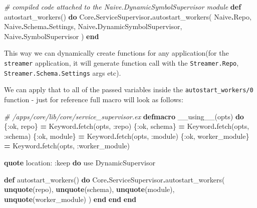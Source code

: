 \documentclass[
]{book}
\newenvironment{Shaded}{\begin{snugshade}}{\end{snugshade}}
\newcommand{\CommentTok}[1]{\textcolor[rgb]{0.56,0.35,0.01}{\textit{#1}}}
\newcommand{\ConstantTok}[1]{\textcolor[rgb]{0.00,0.00,0.00}{#1}}
\newcommand{\ImportTok}[1]{#1}
\newcommand{\KeywordTok}[1]{\textcolor[rgb]{0.13,0.29,0.53}{\textbf{#1}}}
\newcommand{\NormalTok}[1]{#1}
\newcommand{\OperatorTok}[1]{\textcolor[rgb]{0.81,0.36,0.00}{\textbf{#1}}}
\newcommand{\VariableTok}[1]{\textcolor[rgb]{0.00,0.00,0.00}{#1}}
\begin{document}
\begin{Shaded}
\begin{Highlighting}[]
    \CommentTok{\# compiled code attached to the \textasciigrave{}Naive.DynamicSymbolSupervisor\textasciigrave{} module}
    \KeywordTok{def}\NormalTok{ autostart\_workers() }\KeywordTok{do}
      \ConstantTok{Core}\OperatorTok{.}\ConstantTok{ServiceSupervisor}\OperatorTok{.}\NormalTok{autostart\_workers(}
        \ConstantTok{Naive}\OperatorTok{.}\ConstantTok{Repo}\NormalTok{,}
        \ConstantTok{Naive}\OperatorTok{.}\ConstantTok{Schema}\OperatorTok{.}\ConstantTok{Settings}\NormalTok{,}
        \ConstantTok{Naive}\OperatorTok{.}\ConstantTok{DynamicSymbolSupervisor}\NormalTok{,}
        \ConstantTok{Naive}\OperatorTok{.}\ConstantTok{SymbolSupervisor}
\NormalTok{      )}
    \KeywordTok{end}
\end{Highlighting}
\end{Shaded}

This way we can dynamically create functions for any application(for the \texttt{streamer} application, it will generate function call with the \texttt{Streamer.Repo}, \texttt{Streamer.Schema.Settings} args etc).

We can apply that to all of the passed variables inside the \texttt{autostart\_workers/0} function - just for reference full macro will look as follows:

\begin{Shaded}
\begin{Highlighting}[]
  \CommentTok{\# /apps/core/lib/core/service\_supervisor.ex}
  \KeywordTok{defmacro}\NormalTok{ \_\_using\_\_(opts) }\KeywordTok{do}
\NormalTok{    \{}\VariableTok{:ok}\NormalTok{, repo\} }\OperatorTok{=} \ConstantTok{Keyword}\OperatorTok{.}\NormalTok{fetch(opts, }\VariableTok{:repo}\NormalTok{)}
\NormalTok{    \{}\VariableTok{:ok}\NormalTok{, schema\} }\OperatorTok{=} \ConstantTok{Keyword}\OperatorTok{.}\NormalTok{fetch(opts, }\VariableTok{:schema}\NormalTok{)}
\NormalTok{    \{}\VariableTok{:ok}\NormalTok{, module\} }\OperatorTok{=} \ConstantTok{Keyword}\OperatorTok{.}\NormalTok{fetch(opts, }\VariableTok{:module}\NormalTok{)}
\NormalTok{    \{}\VariableTok{:ok}\NormalTok{, worker\_module\} }\OperatorTok{=} \ConstantTok{Keyword}\OperatorTok{.}\NormalTok{fetch(opts, }\VariableTok{:worker\_module}\NormalTok{)}

    \KeywordTok{quote} \VariableTok{location:} \VariableTok{:keep} \KeywordTok{do}
      \ImportTok{use} \ConstantTok{DynamicSupervisor}

      \KeywordTok{def}\NormalTok{ autostart\_workers() }\KeywordTok{do}
        \ConstantTok{Core}\OperatorTok{.}\ConstantTok{ServiceSupervisor}\OperatorTok{.}\NormalTok{autostart\_workers(}
          \KeywordTok{unquote}\NormalTok{(repo),}
          \KeywordTok{unquote}\NormalTok{(schema),}
          \KeywordTok{unquote}\NormalTok{(module),}
          \KeywordTok{unquote}\NormalTok{(worker\_module)}
\NormalTok{        )}
      \KeywordTok{end}
    \KeywordTok{end}
  \KeywordTok{end}
\end{Highlighting}
\end{Shaded}
\end{document}
